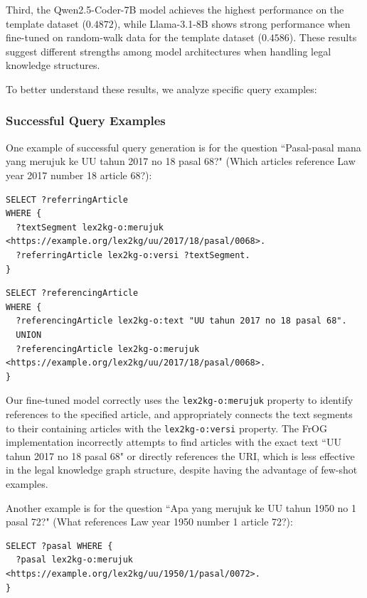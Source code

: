 Third, the Qwen2.5-Coder-7B model achieves the highest performance on the template dataset ($0.4872$), while Llama-3.1-8B shows strong performance when fine-tuned on random-walk data for the template dataset ($0.4586$). These results suggest different strengths among model architectures when handling legal knowledge structures.

To better understand these results, we analyze specific query examples:

\subsubsection{Successful Query Examples}
One example of successful query generation is for the question ``Pasal-pasal mana yang merujuk ke UU tahun 2017 no 18 pasal 68?" (Which articles reference Law year 2017 number 18 article 68?):

\begin{lstlisting}[language=SPARQL, caption=Our Template Fine-tuned Model Output for Article References, label=code:legal-ref-finetuned]
SELECT ?referringArticle
WHERE {
  ?textSegment lex2kg-o:merujuk <https://example.org/lex2kg/uu/2017/18/pasal/0068>.
  ?referringArticle lex2kg-o:versi ?textSegment.
}
\end{lstlisting}

\begin{lstlisting}[language=SPARQL, caption=FrOG Output for Article References, label=code:legal-ref-previous]
SELECT ?referencingArticle
WHERE {
  ?referencingArticle lex2kg-o:text "UU tahun 2017 no 18 pasal 68".
  UNION
  ?referencingArticle lex2kg-o:merujuk <https://example.org/lex2kg/uu/2017/18/pasal/0068>.
}
\end{lstlisting}

Our fine-tuned model correctly uses the \texttt{lex2kg-o:merujuk} property to identify references to the specified article, and appropriately connects the text segments to their containing articles with the \texttt{lex2kg-o:versi} property. The FrOG implementation incorrectly attempts to find articles with the exact text ``UU tahun 2017 no 18 pasal 68" or directly references the URI, which is less effective in the legal knowledge graph structure, despite having the advantage of few-shot examples.

Another example is for the question ``Apa yang merujuk ke UU tahun 1950 no 1 pasal 72?" (What references Law year 1950 number 1 article 72?):

\begin{lstlisting}[language=SPARQL, caption=Our Random-Walk Fine-tuned Model Output for Article References, label=code:legal-ref2-finetuned]
SELECT ?pasal WHERE {
  ?pasal lex2kg-o:merujuk <https://example.org/lex2kg/uu/1950/1/pasal/0072>.
}
\end{lstlisting}

